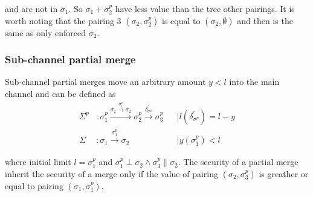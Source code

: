 \documentclass{llncs}
\begin{document}
and are not in $\sigma_1$. So $\sigma_1 + \sigma^p_2$ have less value than the tree other pairings. It is worth noting that the pairing 3 $(\sigma_2, \sigma^p_2)$ is equal to $(\sigma_2, \emptyset)$ and then is the same as only enforced $\sigma_2$.

\subsubsection{Sub-channel partial merge} Sub-channel partial merges move an arbitrary amount $y < l$ into the main channel and can be defined as
\begin{align*}
    \Sigma^p&: \sigma_1^p \xrightarrow{\sigma_1 \xrightarrow{\sigma_1^p} \sigma_2} \sigma_2^p \xrightarrow{\delta^\prime_{\sigma^p}} \sigma_3^p & &\mid l(\delta^\prime_{\sigma^p}) = l - y \\
    \Sigma&: \sigma_1 \xrightarrow{\sigma_1^p} \sigma_2 & &\mid y(\sigma_1^p) < l
\end{align*}

where initial limit $l = \sigma^p_1$ and $\sigma^p_1 \perp \sigma_2 \land \sigma^p_3 \parallel \sigma_2$. The security of a partial merge inherit the security of a merge only if the value of pairing $(\sigma_2, \sigma^p_3)$ is greather or equal to pairing $(\sigma_1, \sigma^p_1)$.
\end{document}
